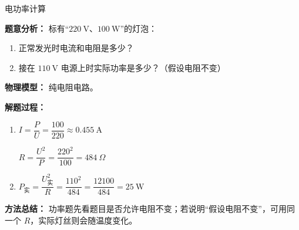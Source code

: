 \begin{examplebox}{电功率计算}

\textbf{题意分析：} 标有“$220\ \mathrm{V}$、$100\ \mathrm{W}$”的灯泡：
\begin{enumerate}
  \item 正常发光时电流和电阻是多少？
  \item 接在 $110\ \mathrm{V}$ 电源上时实际功率是多少？（假设电阻不变）
\end{enumerate}

\textbf{物理模型：} 纯电阻电路。

\textbf{解题过程：}

\begin{enumerate}
  \item $I = \dfrac{P}{U} = \dfrac{100}{220} \approx 0.455\ \mathrm{A}$

  $R = \dfrac{U^2}{P} = \dfrac{220^2}{100} = 484\ \Omega$

  \item $P_{\text{实}} = \dfrac{U_{\text{实}}^2}{R} = \dfrac{110^2}{484} = \dfrac{12100}{484} = 25\ \mathrm{W}$
\end{enumerate}

\textbf{方法总结：} 功率题先看题目是否允许电阻不变；若说明“假设电阻不变”，可用同一个 $R$，实际灯丝则会随温度变化。

\end{examplebox}

